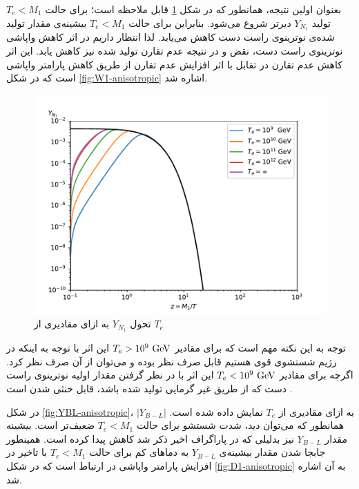 \documentclass[a4paper]{book}
\begin{document}
بعنوان اولین نتیجه، همانطور که در شکل \ref{fig:YN1-anisotropic} قابل ملاحظه است؛ برای حالت {\footnotesize$T_e<M_1$} تولید {\footnotesize$Y_{N_1}$} دیرتر شروع می‌شود. بنابراین برای حالت {\footnotesize$T_e<M_1$} بیشینه‌ی مقدار تولید شده‌ی نوترینوی راست دست کاهش می‌یابد. لذا انتظار داریم در اثر کاهش واپاشی نوترینوی راست دست، نقض  و در نتیجه عدم تقارن تولید شده نیز کاهش یابد. این اثر کاهش عدم تقارن در تقابل با اثر افزایش عدم تقارن از طریق کاهش پارامتر واپاشی است که در شکل \ref{fig:W1-anisotropic} اشاره شد.
\begin{figure}[!h]
	\centering
	\includegraphics[width=13cm]{fig-N1-anisotropic.pdf}
	\caption{تحول {\footnotesize$Y_{N_1}$} به ازای مقادیری از {\footnotesize$T_e$} \label{fig:YN1-anisotropic}}
\end{figure}
توجه به این نکته مهم است که برای مقادیر {\footnotesize$T_e>10^9\ {\rm GeV}$} این اثر با توجه به اینکه در رژیم شستشوی قوی هستیم قابل صرف نظر بوده و می‌توان از آن صرف نظر کرد. اگرچه برای مقادیر {\footnotesize$T_e<10^9\ {\rm GeV}$} این اثر با در نظر گرفتن مقدار اولیه نوترینوی راست دست که از طریق غیر گرمایی تولید شده باشد، قابل خنثی شدن است \cite{Giudice:2003jh}.

در شکل \ref{fig:YBL-anisotropic}، {\footnotesize$|Y_{B-L}|$} به ازای مقادیری از {\footnotesize$T_e$} نمایش داده شده است. همانطور که می‌توان دید، شدت شستشو برای حالت {\footnotesize$T_e<M_1$} ضعیف‌تر است. بیشینه مقدار {\footnotesize$Y_{B-L}$} نیز بدلیلی که در پاراگراف اخیر ذکر شد کاهش پیدا کرده است. همینطور جابجا شدن مقدار بیشینه‌ی {\footnotesize$Y_{B-L}$} به دماهای کم برای حالت {\footnotesize$T_e<M_1$} با تاخیر در افزایش پارامتر واپاشی در ارتباط است که در شکل \ref{fig:D1-anisotropic} به آن اشاره شد.
\end{document}
